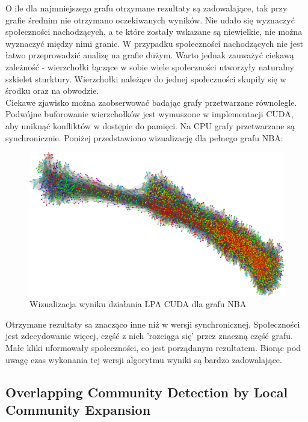 \documentclass{article}
\begin{document}
O ile dla najmniejszego grafu otrzymane rezultaty są zadowalające, tak przy grafie średnim nie otrzymano oczekiwanych wyników. Nie udało się wyznaczyć społeczności nachodzących, a te które zostały wskazane są niewielkie, nie można wyznaczyć między nimi granic. W przypadku społeczności nachodzących nie jest łatwo przeprowadzić analizę na grafie dużym. Warto jednak zauważyć ciekawą zależność - wierzchołki łączące w sobie wiele społeczności utworzyły naturalny szkielet sturktury. Wierzchołki należące do jednej społeczności skupiły się w środku oraz na obwodzie.\\

Ciekawe zjawisko można zaobserwować badając grafy przetwarzane równolegle. Podwójne buforowanie wierzchołków jest wymuszone w implementacji CUDA, aby uniknąć konfliktów w dostępie do pamięci. Na CPU grafy przetwarzane są synchronicznie. Poniżej przedstawiono wizualizację dla pełnego grafu NBA:

\begin{figure}[H]
\centering
\includegraphics[width=\textwidth]{images/ms-cuda.png}
\caption{Wizualizacja wyniku działania LPA CUDA dla grafu NBA}
\end{figure}

Otrzymane rezultaty sa znacząco inne niż w wersji synchronicznej. Społeczności jest zdecydowanie więcej, część z nich 'rozciąga się' przez znaczną część grafu. Małe kliki uformowały społeczności, co jest porządanym rezultatem. Biorąc pod uwagę czas wykonania tej wersji algorytmu wyniki są bardzo zadowalające.

\subsection{Overlapping Community Detection by Local Community Expansion}
\end{document}
